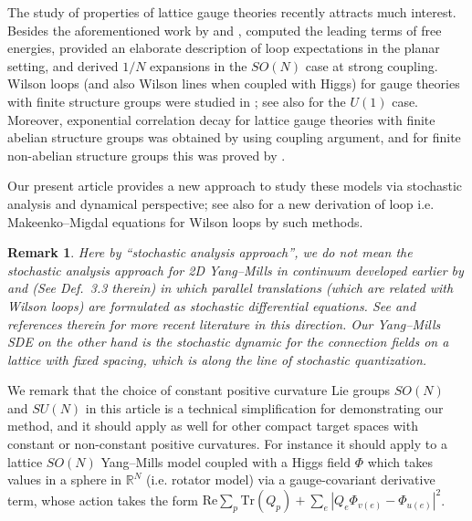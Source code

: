 \documentclass[11pt,UTF-8,reqno]{amsart}
\numberwithin{equation}{section}
\newtheorem{remark}[theorem]{Remark}
\def\Re{{\mathrm{Re}}}
\def\Tr{\mathrm{Tr}}
\def\Re{{\mathrm{Re}}}
\def\br{\begin{remark}}
\def\er{\end{remark}}
\def\R{\mathbb R}
\begin{document}
The study of properties of lattice gauge theories 
recently attracts much interest.
Besides the aforementioned work by \cite{Cha} and \cite{Jafar},
\cite{Chatterjee16}  computed the 
leading terms of free energies, \cite{MR3861073}
provided an elaborate description of loop expectations in the planar setting,
and \cite{ChatterjeeJafar} derived $1/N$ expansions
in the $SO(N)$ case at strong coupling.
Wilson loops (and also Wilson lines when coupled with Higgs) 
for gauge theories with 
finite structure groups were studied in \cite{MR4107931,FLV20,FLV21,Cao20,forsstromAbelian,Adhikari2021};
see also \cite{GS21} for the $U(1)$ case.
Moreover, exponential correlation decay for lattice gauge theories with finite abelian structure groups was obtained by \cite{Forsstrom2021}
using coupling argument, and for  finite non-abelian structure groups
this was proved by \cite{DdhikariCao}.  

Our present article provides a new approach to study these models
via stochastic analysis and dynamical perspective;
see also  \cite{SSZloop} for a new derivation of loop i.e. Makeenko--Migdal  equations for Wilson loops
 by such methods. 

\br
Here by ``stochastic analysis approach'', we do not mean 
the stochastic analysis approach for 2D Yang--Mills in continuum
developed earlier by \cite{GKS89} and \cite{Driver89} (See Def.~3.3 therein) in which parallel translations (which are related with Wilson loops) are formulated as stochastic differential equations.
See \cite{MR3982691} and references therein for more recent literature in this direction.
Our Yang--Mills SDE on the other hand is the stochastic dynamic for 
the connection fields on a lattice with fixed spacing, which is 
along the line of stochastic quantization.
\er

We remark that the choice of constant positive curvature Lie groups $SO(N)$ and $SU(N)$ in this article is a technical simplification for demonstrating our method, 
and it should apply as well  for other compact target spaces with constant or non-constant positive curvatures. %
For instance  it should apply to a lattice $SO(N)$ Yang--Mills model coupled with a 
Higgs field  $\Phi$ which takes values in a sphere in $\R^N$ (i.e. rotator model)
via a gauge-covariant derivative term, whose action takes the form 
$ \Re \sum_{p} \Tr(Q_p) + \sum_e |Q_e \Phi_{v(e)} - \Phi_{u(e)}|^2$.
\end{document}
